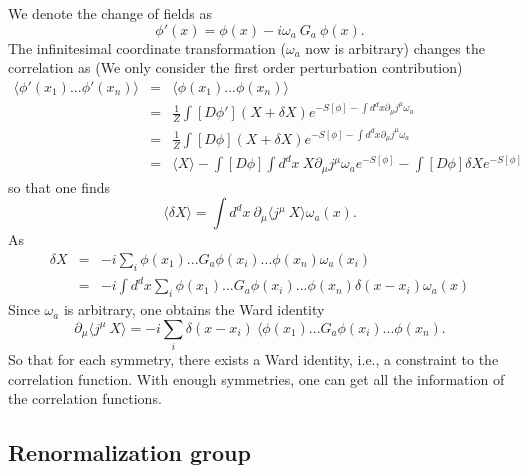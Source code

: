 \documentclass[submission, PhysLectNotes]{SciPost}
\begin{document}
We denote the change of fields as
\begin{equation}
    \phi'(x) = \phi(x) -i\omega_a\ G_a\ \phi(x).
\end{equation}
The infinitesimal coordinate transformation ($\omega_a$ now is arbitrary) changes the correlation as (We only consider the first order perturbation contribution) 
\begin{eqnarray}
\langle \phi'(x_1)... \phi'(x_n)\rangle &=& \langle \phi(x_1)... \phi(x_n)\rangle \\ 
&=& \frac{1}{Z} \int [D\phi'] (X+\delta X) e^{-S[\phi] - \int d^dx\partial_\mu j^\mu \omega_a} \\
&=& \frac{1}{Z} \int [D\phi] (X+\delta X) e^{-S[\phi] - \int d^dx\partial_\mu j^\mu \omega_a} \\
&=& \langle X \rangle - \int [D\phi] \int d^dx\ X \partial_\mu j^\mu \omega_a e^{-S[\phi]} - \int [D\phi] \delta X  e^{-S[\phi]}
\end{eqnarray}
so that one finds
\begin{equation}
    \langle\delta X\rangle = \int d^dx \ \partial_\mu\langle j^\mu \ X\rangle \omega_a(x).
\end{equation}
As
\begin{eqnarray}
\delta X &=& -i \sum_i \phi(x_1)...G_a \phi(x_i)...\phi(x_n)\omega_a(x_i) \\
&=& -i \int d^dx \sum_i \phi(x_1)...G_a \phi(x_i)...\phi(x_n)\delta(x-x_i)\omega_a(x)
\end{eqnarray}
Since $\omega_a$ is arbitrary, one obtains the Ward identity
\begin{equation}
    \partial_\mu\langle j^\mu \ X\rangle = -i \sum_i \delta(x-x_i)\ \langle \phi(x_1)...G_a \phi(x_i)...\phi(x_n).
\end{equation}
So that for each symmetry, there exists a Ward identity, i.e., a constraint to the correlation function. With enough symmetries, one can get all the information of the correlation functions.

\subsection{Renormalization group}
\end{document}
